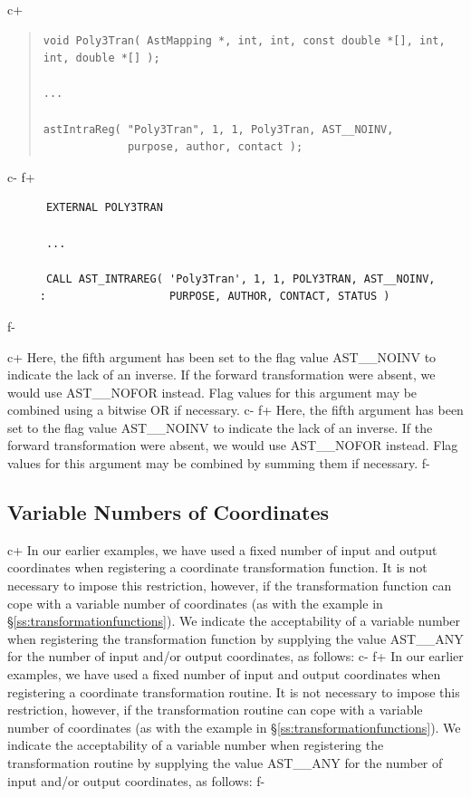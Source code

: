 \documentclass[twoside,11pt]{article}
\newcommand{\secref}[1]{\S\ref{#1}}
\newcommand{\secref}[1]{\ref{#1}}
\begin{document}
c+
\begin{quote}
\small
\begin{verbatim}
void Poly3Tran( AstMapping *, int, int, const double *[], int, int, double *[] );

...

astIntraReg( "Poly3Tran", 1, 1, Poly3Tran, AST__NOINV,
             purpose, author, contact );
\end{verbatim}
\normalsize
\end{quote}
c-
f+
\small
\begin{verbatim}
      EXTERNAL POLY3TRAN

      ...

      CALL AST_INTRAREG( 'Poly3Tran', 1, 1, POLY3TRAN, AST__NOINV,
     :                   PURPOSE, AUTHOR, CONTACT, STATUS )
\end{verbatim}
\normalsize
f-

c+
Here, the fifth argument has been set to the flag value AST\_\_NOINV
to indicate the lack of an inverse. If the forward transformation were
absent, we would use AST\_\_NOFOR instead. Flag values for this
argument may be combined using a bitwise OR if necessary.
c-
f+
Here, the fifth argument has been set to the flag value AST\_\_NOINV
to indicate the lack of an inverse. If the forward transformation were
absent, we would use AST\_\_NOFOR instead. Flag values for this
argument may be combined by summing them if necessary.
f-

\subsection{\label{ss:variableintramapcoordinates}Variable Numbers of Coordinates}

c+
In our earlier examples, we have used a fixed number of input and
output coordinates when registering a coordinate transformation
function. It is not necessary to impose this restriction, however, if
the transformation function can cope with a variable number of
coordinates (as with the example in
\secref{ss:transformationfunctions}). We indicate the acceptability of
a variable number when registering the transformation function by
supplying the value AST\_\_ANY for the number of input and/or output
coordinates, as follows:
c-
f+
In our earlier examples, we have used a fixed number of input and
output coordinates when registering a coordinate transformation
routine. It is not necessary to impose this restriction, however, if
the transformation routine can cope with a variable number of
coordinates (as with the example in
\secref{ss:transformationfunctions}). We indicate the acceptability of
a variable number when registering the transformation routine by
supplying the value AST\_\_ANY for the number of input and/or output
coordinates, as follows:
f-
\end{document}
